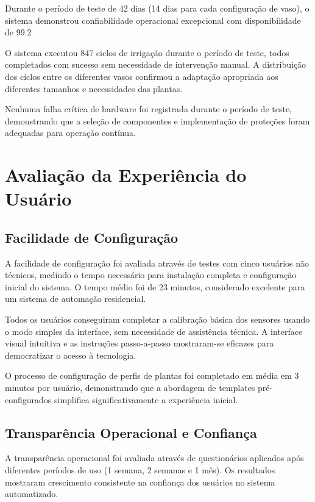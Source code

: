 \documentclass[twoside,english,brazilian]{UNISINOSmonografia}
\begin{document}
Durante o período de teste de 42 dias (14 dias para cada configuração de vaso), o sistema demonstrou confiabilidade operacional excepcional com disponibilidade de 99.2%

O sistema executou 847 ciclos de irrigação durante o período de teste, todos completados com sucesso sem necessidade de intervenção manual. A distribuição dos ciclos entre os diferentes vasos confirmou a adaptação apropriada aos diferentes tamanhos e necessidades das plantas.

Nenhuma falha crítica de hardware foi registrada durante o período de teste, demonstrando que a seleção de componentes e implementação de proteções foram adequadas para operação contínua.

\section{Avaliação da Experiência do Usuário}

\subsection{Facilidade de Configuração}

A facilidade de configuração foi avaliada através de testes com cinco usuários não técnicos, medindo o tempo necessário para instalação completa e configuração inicial do sistema. O tempo médio foi de 23 minutos, considerado excelente para um sistema de automação residencial.

Todos os usuários conseguiram completar a calibração básica dos sensores usando o modo simples da interface, sem necessidade de assistência técnica. A interface visual intuitiva e as instruções passo-a-passo mostraram-se eficazes para democratizar o acesso à tecnologia.

O processo de configuração de perfis de plantas foi completado em média em 3 minutos por usuário, demonstrando que a abordagem de templates pré-configurados simplifica significativamente a experiência inicial.

\subsection{Transparência Operacional e Confiança}

A transparência operacional foi avaliada através de questionários aplicados após diferentes períodos de uso (1 semana, 2 semanas e 1 mês). Os resultados mostraram crescimento consistente na confiança dos usuários no sistema automatizado.
\end{document}
